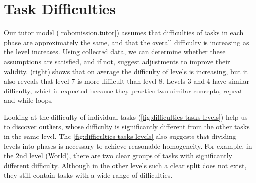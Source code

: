 \section{Task Difficulties}


Our tutor model (\cref{robomission.tutor}) assumes that difficulties of tasks
in each phase are approximately the same,
and that the overall difficulty is increasing as the level increases.   %
Using collected data, we can determine whether these assumptions are satisfied,
and if not, suggest adjustments to improve their validity.
 (right) shows that on average the difficulty of levels
is increasing, but it also reveals that level 7 is more difficult than level 8.
Levels 3 and 4 have similar difficulty, which is expected because they practice
two similar concepts, repeat and while loops.

Looking at the difficulty of individual tasks (\cref{fig:difficulties-tasks-levels})
help us to discover outliers, whose difficulty is significantly
different from the other tasks in the same level.
The \cref{fig:difficulties-tasks-levels} also suggests that dividing levels
into phases is necessary to achieve reasonable homogeneity. For example, in the 2nd
level (World), there are two clear groups of tasks with significantly different
difficulty. Although in the other levels such a clear split does not exist,
they still contain tasks with a wide range of difficulties. %

